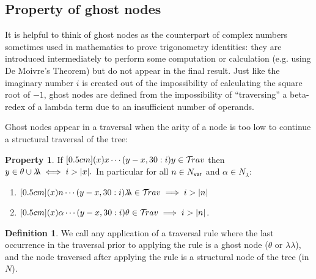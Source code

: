 \documentclass{article}
\theoremstyle{definition}
\newtheorem{definition}{Definition}[section]
\newtheorem{property}{Property}[section]
\newcommand\Nodes{N}%
\newcommand\NodesVar{N_{\sf var}}%
\newcommand\NodesLmd{N_\lambda}%
\newcommand{\ghostlmd}{{\lambda\!\!\lambda}}
\newcommand{\ghostvar}{\theta}
\newcommand{\travulc}{\travset}
\begin{document}
\subsection{Property of ghost nodes}

It is helpful to think of ghost nodes as the counterpart of complex numbers sometimes used in mathematics
to prove trigonometry identities: they are introduced intermediately to perform some computation or calculation (e.g. using De Moivre's Theorem) but do not appear in the final result. Just like the imaginary number $i$ is created out of the impossibility of calculating the square root of $-1$, ghost nodes are defined from the impossibility of ``traversing'' a beta-redex of a lambda term due to an insufficient number of operands.


Ghost nodes appear in a traversal when the arity of a node is too low to continue a
structural traversal of the tree:
\begin{property}
If $\Pstr[0.5cm]{(x){x} \cdots (y-x,30:i){y}} \in \travulc$ then
$ y \in \ghostvar \union \ghostlmd \iff i > |x|.$
In particular for all $n\in\NodesVar$ and $\alpha\in\NodesLmd$:
\begin{enumerate}
\item $\Pstr[0.5cm]{(x){n} \cdots (y-x,30:i){\ghostlmd}} \in \travulc \implies i > |n|$
\item $\Pstr[0.5cm]{(x){\alpha} \cdots (y-x,30:i){\ghostvar}} \in \travulc \implies i > |n|$.
\end{enumerate}
\end{property}

\begin{definition}
We call  any application of a traversal rule where the last occurrence in the traversal prior to applying the rule is a ghost node ($\ghostvar$ or $\ghostlmd$), and the node traversed after applying the rule is a structural node of the tree (in $\Nodes$).
\end{definition}
\end{document}
